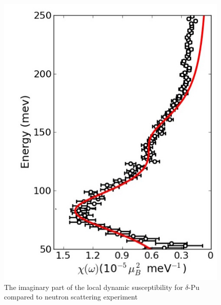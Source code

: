 \documentclass[10pt]{ruthesis}
\begin{document}
{\begin{figure}[H]
\begin{center}
\includegraphics[scale=0.5]{Susc_pu_cropped.jpg}
\caption{ The imaginary part of the local dynamic susceptibility for $\delta$-Pu compared to neutron scattering experiment \cite{Me_Pu} }
\label{Susc_Pu}
\end{center}
\end{figure}

}
\end{document}
